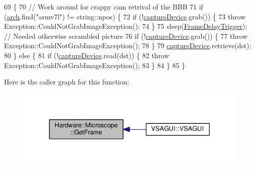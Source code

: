 \begin{DoxyCode}
69                                     \{
70   \textcolor{comment}{// Work around for crappy cam retrival of the BBB}
71   \textcolor{keywordflow}{if} (\hyperlink{class_hardware_1_1_microscope_a2e74ed11f3426a1a6adf05ec2d842066}{arch}.find(\textcolor{stringliteral}{"armv7l"}) != string::npos) \{
72     \textcolor{keywordflow}{if} (!\hyperlink{class_hardware_1_1_microscope_a8fd921d7c937e808c5bc44c0294aa490}{captureDevice}.grab()) \{
73       \textcolor{keywordflow}{throw} Exception::CouldNotGrabImageException();
74     \}
75     sleep(\hyperlink{class_hardware_1_1_microscope_ac2da14781a22924a389fc287df3dbfda}{FrameDelayTrigger}); \textcolor{comment}{// Needed otherwise scrambled picture}
76     \textcolor{keywordflow}{if} (!\hyperlink{class_hardware_1_1_microscope_a8fd921d7c937e808c5bc44c0294aa490}{captureDevice}.grab()) \{
77       \textcolor{keywordflow}{throw} Exception::CouldNotGrabImageException();
78     \}
79     \hyperlink{class_hardware_1_1_microscope_a8fd921d7c937e808c5bc44c0294aa490}{captureDevice}.retrieve(dst);
80   \} \textcolor{keywordflow}{else} \{
81     \textcolor{keywordflow}{if} (!\hyperlink{class_hardware_1_1_microscope_a8fd921d7c937e808c5bc44c0294aa490}{captureDevice}.read(dst)) \{
82       \textcolor{keywordflow}{throw} Exception::CouldNotGrabImageException();
83     \}
84   \}
85 \}
\end{DoxyCode}


Here is the caller graph for this function\+:\nopagebreak
\begin{figure}[H]
\begin{center}
\leavevmode
\includegraphics[width=330pt]{class_hardware_1_1_microscope_a1ec5c792320ae4db3f3b39830e74f880_icgraph}
\end{center}
\end{figure}


\hypertarget{class_hardware_1_1_microscope_a8cec2eacbd3f0ea164d16100a6078d5b}{}
